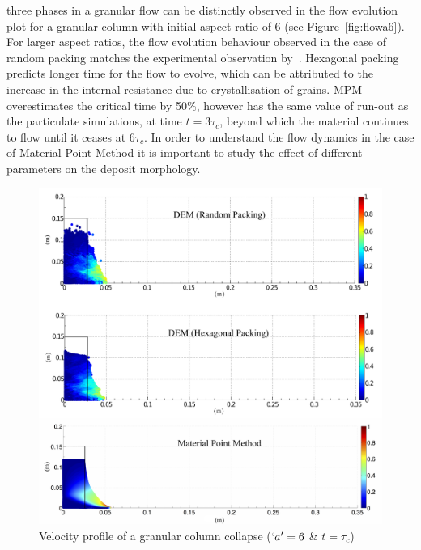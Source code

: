 three phases in a granular flow can be distinctly observed in the flow 
evolution plot for a granular column with initial aspect ratio of 6 (see 
Figure~\cref{fig:flowa6}). For larger aspect ratios, the flow evolution 
behaviour 
observed in the case of random packing matches the experimental observation 
by~\citet{Lajeunesse2004}. Hexagonal packing predicts longer time for the flow 
to evolve, which can be attributed to the increase in the internal resistance 
due to crystallisation of grains. MPM overestimates the critical time by 50\%, 
however has the same value of run-out as the particulate simulations, at time 
$\textit{t}=3\tau_{c}$, beyond which the material continues to flow until it 
ceases at 6$\tau_{c}$. In order to understand the flow dynamics in the case of 
Material Point Method it is important to study the effect of different 
parameters on the deposit morphology. 

\begin{figure}[tbhp]
\centering
\includegraphics[width=\textwidth]{a6tc}
\caption{Velocity profile of a granular column collapse ($`a' = 6$ \& 
$t=\tau_c$)}
\label{fig:a6tc}
\end{figure}

